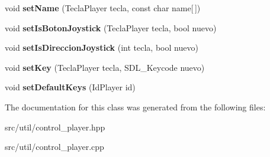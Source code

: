 \begin{DoxyCompactItemize}
\item 
void {\bfseries set\+Name} (Tecla\+Player tecla, const char name\mbox{[}$\,$\mbox{]})\hypertarget{class_control_player_ae7bb88aea934e2d834877972cf4fa64f}{}\label{class_control_player_ae7bb88aea934e2d834877972cf4fa64f}

\item 
void {\bfseries set\+Is\+Boton\+Joystick} (Tecla\+Player tecla, bool nuevo)\hypertarget{class_control_player_a011f818a1fe293998df18f412e3bb108}{}\label{class_control_player_a011f818a1fe293998df18f412e3bb108}

\item 
void {\bfseries set\+Is\+Direccion\+Joystick} (int tecla, bool nuevo)\hypertarget{class_control_player_a69c332c460a3251782dceb48bb59ca56}{}\label{class_control_player_a69c332c460a3251782dceb48bb59ca56}

\item 
void {\bfseries set\+Key} (Tecla\+Player tecla, S\+D\+L\+\_\+\+Keycode nuevo)\hypertarget{class_control_player_a440681339dfc3b4a32e4bc8dfeeb7df1}{}\label{class_control_player_a440681339dfc3b4a32e4bc8dfeeb7df1}

\item 
void {\bfseries set\+Default\+Keys} (Id\+Player id)\hypertarget{class_control_player_a0df9d15f3e0a45c6b37288c27fc0f7c5}{}\label{class_control_player_a0df9d15f3e0a45c6b37288c27fc0f7c5}

\end{DoxyCompactItemize}


The documentation for this class was generated from the following files\+:\begin{DoxyCompactItemize}
\item 
src/util/control\+\_\+player.\+hpp\item 
src/util/control\+\_\+player.\+cpp\end{DoxyCompactItemize}
